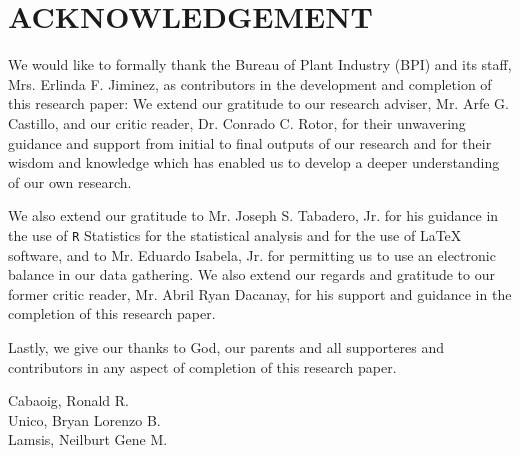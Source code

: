 \chapter{ACKNOWLEDGEMENT}
{
\singlespacing
We would like to formally thank the Bureau of Plant Industry (BPI) and its staff, 
Mrs. Erlinda F. Jiminez, as contributors in the development and completion of this 
research paper: We extend our gratitude to our research adviser, Mr. Arfe G. Castillo, 
and our  critic reader, Dr. Conrado C. Rotor, for their  unwavering guidance and 
support from initial to final outputs  of our research and for their wisdom and 
knowledge which has enabled us to develop a deeper understanding of our own research.

We also extend our gratitude to Mr. Joseph S. Tabadero, Jr. for his guidance in the use of 
\texttt{R} Statistics for the statistical analysis and for the use of \LaTeX{} software, 
and to Mr. Eduardo Isabela, Jr. for permitting us to use an electronic balance in our 
data gathering. We also extend our regards and gratitude to our former critic reader, 
Mr. Abril Ryan Dacanay, for his support and guidance in the completion of this  research 
paper.

Lastly, we give our thanks to God, our parents and all supporteres and contributors in 
any aspect of completion of this research paper.

\begin{flushright}
Cabaoig, Ronald R.\\
Unico, Bryan Lorenzo B.\\
Lamsis, Neilburt Gene M.
\end{flushright}}
\clearpage
\newpage